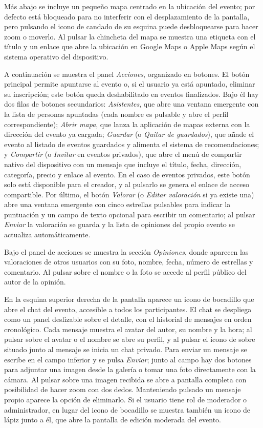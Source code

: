 Más abajo se incluye un pequeño mapa centrado en la ubicación del evento; por defecto está bloqueado para no interferir con el desplazamiento de la pantalla, pero pulsando el icono de candado de su esquina puede desbloquearse para hacer zoom o moverlo. Al pulsar la chincheta del mapa se muestra una etiqueta con el título y un enlace que abre la ubicación en Google Maps o Apple Maps según el sistema operativo del dispositivo.

A continuación se muestra el panel \textit{Acciones}, organizado en botones. El botón principal permite apuntarse al evento o, si el usuario ya está apuntado, eliminar su inscripción; este botón queda deshabilitado en eventos finalizados. Bajo él hay dos filas de botones secundarios: \textit{Asistentes}, que abre una ventana emergente con la lista de personas apuntadas (cada nombre es pulsable y abre el perfil correspondiente); \textit{Abrir mapa}, que lanza la aplicación de mapas externa con la dirección del evento ya cargada; \textit{Guardar} (o \textit{Quitar de guardados}), que añade el evento al listado de eventos guardados y alimenta el sistema de recomendaciones; y \textit{Compartir} (o \textit{Invitar} en eventos privados), que abre el menú de compartir nativo del dispositivo con un mensaje que incluye el título, fecha, dirección, categoría, precio y enlace al evento. En el caso de eventos privados, este botón solo está disponible para el creador, y al pulsarlo se genera el enlace de acceso compartible. Por último, el botón \textit{Valorar} (o \textit{Editar valoración} si ya existe una) abre una ventana emergente con cinco estrellas pulsables para indicar la puntuación y un campo de texto opcional para escribir un comentario; al pulsar \textit{Enviar} la valoración se guarda y la lista de opiniones del propio evento se actualiza automáticamente.

Bajo el panel de acciones se muestra la sección \textit{Opiniones}, donde aparecen las valoraciones de otros usuarios con su foto, nombre, fecha, número de estrellas y comentario. Al pulsar sobre el nombre o la foto se accede al perfil público del autor de la opinión.

En la esquina superior derecha de la pantalla aparece un icono de bocadillo que abre el chat del evento, accesible a todos los participantes. El chat se despliega como un panel deslizable sobre el detalle, con el historial de mensajes en orden cronológico. Cada mensaje muestra el avatar del autor, su nombre y la hora; al pulsar sobre el avatar o el nombre se abre su perfil, y al pulsar el icono de sobre situado junto al mensaje se inicia un chat privado. Para enviar un mensaje se escribe en el campo inferior y se pulsa \textit{Enviar}; junto al campo hay dos botones para adjuntar una imagen desde la galería o tomar una foto directamente con la cámara. Al pulsar sobre una imagen recibida se abre a pantalla completa con posibilidad de hacer zoom con dos dedos. Manteniendo pulsado un mensaje propio aparece la opción de eliminarlo. Si el usuario tiene rol de moderador o administrador, en lugar del icono de bocadillo se muestra también un icono de lápiz junto a él, que abre la pantalla de edición moderada del evento.

